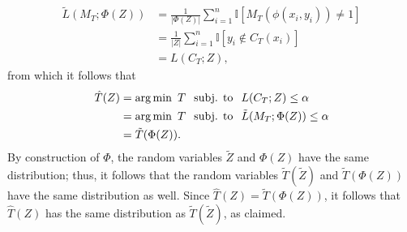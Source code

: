 \documentclass{article} \usepackage{iclr2020_conference,times}
\renewcommand{\(}						{\left(}
\renewcommand{\)}						{\right)}
\renewcommand{\[}						{\left[}
\renewcommand{\]}						{\right]}
\newcommand{\<}						{\left<}
\renewcommand{\>}						{\right>}
\begin{document}
\begin{align*}
\tilde L(M_T;\Phi(Z))
&= \frac{1}{|\Phi(Z)|} \sum_{i=1}^n \mathbb{I}[M_T(\phi(x_i,y_i)) \neq 1] \\
&= \frac{1}{|Z|} \sum_{i=1}^n \mathbb{I}[y_i \not\in C_T(x_i)] \\
&= L(C_T;Z),
\end{align*}
from which it follows that
\begin{align*}
\hat T(Z)
&=\operatorname*{\arg\min}~T\hspace{0.1in}\text{subj. to}\hspace{0.1in}L(C_T;Z)\le\alpha \\
&=\operatorname*{\arg\min}~T\hspace{0.1in}\text{subj. to}\hspace{0.1in}\tilde L(M_T;\Phi(Z))\le\alpha \\
&=\tilde T(\Phi(Z)).
\end{align*}
By construction of $\Phi$, the random variables $\tilde Z$ and $\Phi(Z)$ have the same distribution; thus, it follows that the random variables $\tilde T(\tilde Z)$ and $\tilde T(\Phi(Z))$ have the same distribution as well. Since $\hat T(Z)=\tilde T(\Phi(Z))$, it follows that $\hat T(Z)$ has the same distribution as $\tilde T(\tilde Z)$, as claimed.
\end{document}
